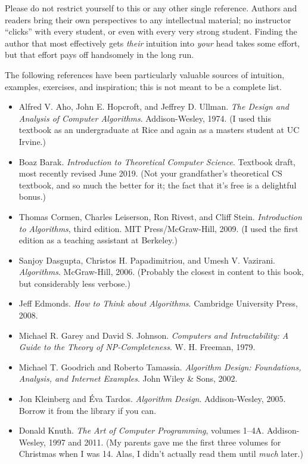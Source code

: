 Please do not restrict yourself to this or any other single reference. Authors and readers bring their own perspectives to any intellectual material; no instructor “clicks” with every student, or even with every very strong student. Finding the author that most effectively gets \textit{their} intuition into \textit{your} head takes some effort, but that effort pays off handsomely in the long run.

The following references have been particularly valuable sources of intuition, examples, exercises, and inspiration; this is not meant to be a complete list.
\begin{itemize}
\item Alfred V. Aho, John E. Hopcroft, and Jeffrey D. Ullman. \textit{The Design and Analysis of Computer Algorithms}. Addison-Wesley, 1974. (I used this textbook as an undergraduate at Rice and again as a masters student at UC Irvine.)
\item Boaz Barak. \textit{Introduction to Theoretical Computer Science}. Textbook draft, most recently revised June 2019. (Not your grandfather’s theoretical CS textbook, and so much the better for it; the fact that it’s free is a delightful bonus.)
\item Thomas Cormen, Charles Leiserson, Ron Rivest, and Cliff Stein. \textit{Introduction to Algorithms}, third edition. MIT Press/McGraw-Hill, 2009. (I used the first edition as a teaching assistant at Berkeley.)
\item Sanjoy Dasgupta, Christos H. Papadimitriou, and Umesh V. Vazirani. \textit{Algorithms}. McGraw-Hill, 2006. (Probably the closest in content to this book, but considerably less verbose.)
\item Jeff Edmonds. \textit{How to Think about Algorithms}. Cambridge University Press, 2008.
\item Michael R. Garey and David S. Johnson. \textit{Computers and Intractability: A Guide to the Theory of NP-Completeness}. W. H. Freeman, 1979.
\item Michael T. Goodrich and Roberto Tamassia. \textit{Algorithm Design: Foundations, Analysis, and Internet Examples}. John Wiley \& Sons, 2002.
\item Jon Kleinberg and Éva Tardos. \textit{Algorithm Design}. Addison-Wesley, 2005. Borrow it from the library if you can.
\item Donald Knuth. \textit{The Art of Computer Programming}, volumes 1–4A. Addison-Wesley, 1997 and 2011. (My parents gave me the first three volumes for Christmas when I was 14. Alas, I didn’t actually read them until \textit{much} later.)

\end{itemize}
